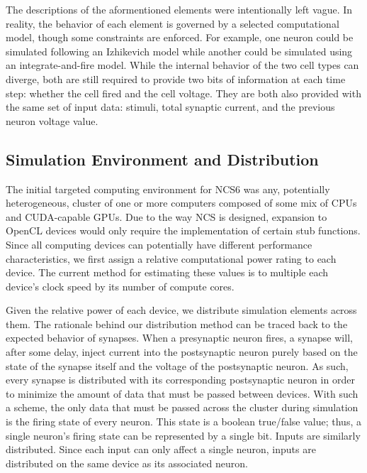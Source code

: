 The descriptions of the aformentioned elements were intentionally left
vague. In reality, the behavior of each element is governed by a selected
computational model, though some constraints are enforced. For example,
one neuron could be simulated following an Izhikevich model while another
could be simulated using an integrate-and-fire model. While the internal
behavior of the two cell types can diverge, both are still required
to provide two bits of information at each time step: whether the cell
fired and the cell voltage. They are both also provided with the same
set of input data: stimuli, total synaptic current, and the previous
neuron voltage value.

\subsection{Simulation Environment and Distribution}

The initial targeted computing environment for NCS6 was any, potentially
heterogeneous, cluster of one or more computers composed of some mix of
CPUs and CUDA-capable GPUs. Due to the way NCS is designed, expansion
to OpenCL devices would only require the implementation of certain stub
functions. Since all computing devices can potentially have different
performance characteristics, we first assign a relative computational
power rating to each device. The current method for estimating these
values is to multiple each device's clock speed by its number of compute
cores.

Given the relative power of each device, we distribute simulation
elements across them. The rationale behind our distribution method can
be traced back to the expected behavior of synapses. When a presynaptic
neuron fires, a synapse will, after some delay, inject current into the
postsynaptic neuron purely based on the state of the synapse itself
and the voltage of the postsynaptic neuron. As such, every synapse
is distributed with its corresponding postsynaptic neuron in order to
minimize the amount of data that must be passed between devices. With
such a scheme, the only data that must be passed across the cluster
during simulation is the firing state of every neuron. This state is a
boolean true/false value; thus, a single neuron's firing state can be
represented by a single bit. Inputs are similarly distributed. Since
each input can only affect a single neuron, inputs are distributed on
the same device as its associated neuron.

